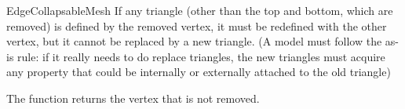 \begin{ccRefConcept}{EdgeCollapsableMesh}
If any triangle (other than the top and bottom, which are removed) is defined by
the removed vertex, it must be redefined with the other vertex, but it cannot
be replaced by a new triangle. (A model must follow the as-is rule: if it really
needs to do replace triangles, the new triangles must acquire any property 
that could be internally or externally attached to the old triangle)

The function returns the vertex that is not removed.

\ccHasModels
{}\\

\ccSeeAlso
{}\\

\end{ccRefConcept}

